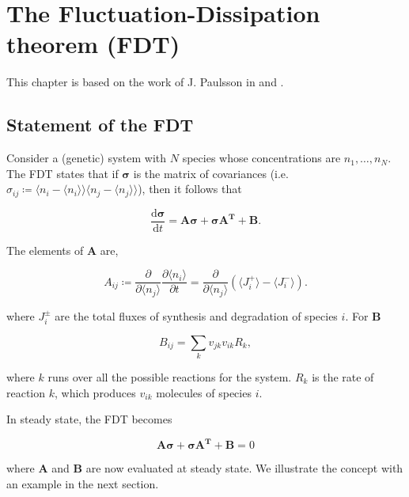 \chapter{The Fluctuation-Dissipation theorem (FDT)}

This chapter is based on the work of J. Paulsson in \cite{paulsson04} and \cite{paulsson05}.

\section{Statement of the FDT}

Consider a (genetic) system with $N$ species whose concentrations are $n_1,\dotsc,n_N$. The FDT states that if $\mathbf{\sigma}$ is the matrix of covariances (i.e. $\sigma_{ij} \coloneqq \langle n_i-\langle n_i\rangle\rangle\langle n_j-\langle n_j\rangle\rangle$), then it follows that 

\begin{equation}
  \label{eq:fdt-fdt1}
  \frac{\mathrm{d}\mathbf{\sigma}}{\mathrm{d}t} = \mathbf{A\sigma} + \mathbf{\sigma A^T}+\mathbf{B}.
\end{equation}

The elements of $\mathbf{A}$ are,

\begin{equation*}
  A_{ij} \coloneqq \frac{\partial}{\partial \langle n_j\rangle}\frac{\partial \langle n_i\rangle}{\partial t} = \frac{\partial}{\partial \langle n_j\rangle}\left(\langle J_i^+\rangle - \langle J_i^-\rangle\right).
\end{equation*}

where $J_i^\pm$ are the total fluxes of synthesis and degradation of species $i$. For $\mathbf{B}$

\begin{equation*}
  B_{ij} = \sum_k v_{jk}v_{ik}R_k,
\end{equation*}

where $k$ runs over all the possible reactions for the system. $R_k$ is the rate of reaction $k$, which produces $v_{ik}$ molecules of species $i$.

In steady state, the FDT becomes

\begin{equation}
  \label{eq:fdt-fdtss}
  \mathbf{A\sigma}+\mathbf{\sigma A^T}+\mathbf{B} = 0
\end{equation}

where $\mathbf{A}$ and $\mathbf{B}$ are now evaluated at steady state. We illustrate the concept with an example in the next section.

